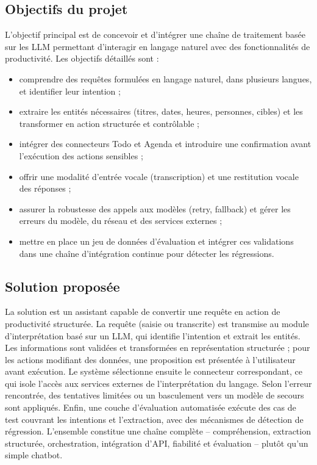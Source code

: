 \documentclass[11pt,a4paper,openany,oneside]{report}
\begin{document}
\subsection{Objectifs du projet}
L'objectif principal est de concevoir et d'intégrer une chaîne de traitement basée sur les LLM permettant d'interagir en langage naturel avec des fonctionnalités de productivité. Les objectifs détaillés sont :
\begin{itemize}
\item comprendre des requêtes formulées en langage naturel, dans plusieurs langues, et identifier leur intention ;
\item extraire les entités nécessaires (titres, dates, heures, personnes, cibles) et les transformer en action structurée et contrôlable ;
\item intégrer des connecteurs Todo et Agenda et introduire une confirmation avant l'exécution des actions sensibles ;
\item offrir une modalité d'entrée vocale (transcription) et une restitution vocale des réponses ;
\item assurer la robustesse des appels aux modèles (retry, fallback) et gérer les erreurs du modèle, du réseau et des services externes ;
\item mettre en place un jeu de données d'évaluation et intégrer ces validations dans une chaîne d'intégration continue pour détecter les régressions.
\end{itemize}

\subsection{Solution proposée}
La solution est un assistant capable de convertir une requête en action de productivité structurée. La requête (saisie ou transcrite) est transmise au module d'interprétation basé sur un LLM, qui identifie l'intention et extrait les entités. Les informations sont validées et transformées en représentation structurée ; pour les actions modifiant des données, une proposition est présentée à l'utilisateur avant exécution. Le système sélectionne ensuite le connecteur correspondant, ce qui isole l'accès aux services externes de l'interprétation du langage. Selon l'erreur rencontrée, des tentatives limitées ou un basculement vers un modèle de secours sont appliqués. Enfin, une couche d'évaluation automatisée exécute des cas de test couvrant les intentions et l'extraction, avec des mécanismes de détection de régression. L'ensemble constitue une chaîne complète -- compréhension, extraction structurée, orchestration, intégration d'API, fiabilité et évaluation -- plutôt qu'un simple chatbot.
\end{document}
